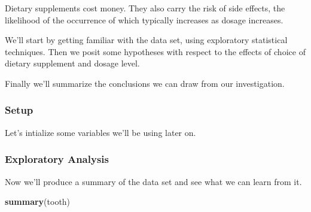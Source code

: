\documentclass[]{article}
\newenvironment{Shaded}{\begin{snugshade}}{\end{snugshade}}
\newcommand{\KeywordTok}[1]{\textcolor[rgb]{0.13,0.29,0.53}{\textbf{#1}}}
\newcommand{\FloatTok}[1]{\textcolor[rgb]{0.00,0.00,0.81}{#1}}
\newcommand{\StringTok}[1]{\textcolor[rgb]{0.31,0.60,0.02}{#1}}
\newcommand{\CommentTok}[1]{\textcolor[rgb]{0.56,0.35,0.01}{\textit{#1}}}
\newcommand{\OperatorTok}[1]{\textcolor[rgb]{0.81,0.36,0.00}{\textbf{#1}}}
\newcommand{\NormalTok}[1]{#1}
\begin{document}
Dietary supplements cost money. They also carry the risk of side
effects, the likelihood of the occurrence of which typically increases
as dosage increases.

We'll start by getting familiar with the data set, using exploratory
statistical techniques. Then we posit some hypotheses with respect to
the effects of choice of dietary supplement and dosage level.

Finally we'll summarize the conclusions we can draw from our
investigation.

\subsubsection{Setup}\label{setup-1}

Let's intialize some variables we'll be using later on.

\begin{Shaded}
\end{Shaded}

\subsubsection{Exploratory Analysis}\label{exploratory-analysis}

Now we'll produce a summary of the data set and see what we can learn
from it.

\begin{Shaded}
\begin{Highlighting}[]
\KeywordTok{summary}\NormalTok{(tooth)}
\end{Highlighting}
\end{Shaded}
\end{document}
